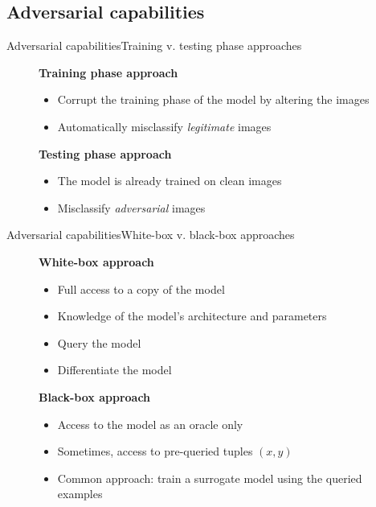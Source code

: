 \documentclass[aspectratio=169]{beamer}
\theoremstyle{definition}
\begin{document}
\subsection{Adversarial capabilities}
\begin{frame}{Adversarial capabilities}{Training v. testing phase approaches}
  \begin{figure}
    \centering
    \begin{minipage}{0.4\textwidth}
      \centering\textbf{Training phase approach}
      \begin{itemize}
        \item Corrupt the training phase of the model by altering the images
        \item Automatically misclassify \emph{legitimate} images
      \end{itemize}
    \end{minipage}
    \hspace{0.1\textwidth}
    \begin{minipage}{0.4\textwidth}
      \centering\textbf{Testing phase approach}
      \begin{itemize}
        \item The model is already trained on clean images
        \item Misclassify \emph{adversarial} images
      \end{itemize}
    \end{minipage}
  \end{figure}
\end{frame}

\begin{frame}{Adversarial capabilities}{White-box v. black-box approaches}
  \begin{figure}
    \centering
    \begin{minipage}{0.4\textwidth}
      \centering\textbf{White-box approach}
      \begin{itemize}
        \item Full access to a copy of the model
        \item Knowledge of the model's architecture and parameters
        \item Query the model
        \item Differentiate the model
      \end{itemize}
    \end{minipage}
    \hspace{0.1\textwidth}
    \begin{minipage}{0.4\textwidth}
      \centering\textbf{Black-box approach}
      \begin{itemize}
        \item Access to the model as an oracle only
        \item Sometimes, access to pre-queried tuples $(x,y)$
        \item Common approach: train a surrogate model using the queried examples
      \end{itemize}
    \end{minipage}
  \end{figure}
\end{frame}
\end{document}
